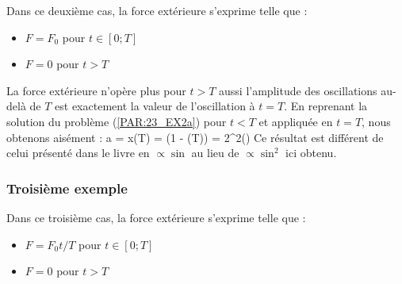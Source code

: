 Dans ce deuxi\`eme cas, la force ext\'erieure s'exprime telle que :
\begin{itemize}
	\item $F = F_{0}$ pour $t \in [0;T]$
	\item $F = 0$ pour $t > T$
\end{itemize}

La force ext\'erieure n'op\`ere plus pour $t > T$ aussi l'amplitude des oscillations au-del\`a de $T$ est exactement la valeur de l'oscillation \`a $t = T$. En reprenant la solution du probl\`eme (\ref{PAR:23_EX2a}) pour $t < T$ et appliqu\'ee en $t = T$, nous obtenons ais\'ement :
\benn
	a = x(T) = (1 - \cos(\omega T)) = 2\sin^{2}\left(\right)
\eenn
Ce r\'esultat est diff\'erent de celui pr\'esent\'e dans le livre en $\propto \sin$ au lieu de $\propto \sin^{2}$ ici obtenu.

\subsubsection{Troisi\`eme exemple}

Dans ce troisi\`eme cas, la force ext\'erieure s'exprime telle que :
\begin{itemize}
	\item $F = F_{0}t/T$ pour $t \in [0;T]$
	\item $F = 0$ pour $t > T$
\end{itemize}

